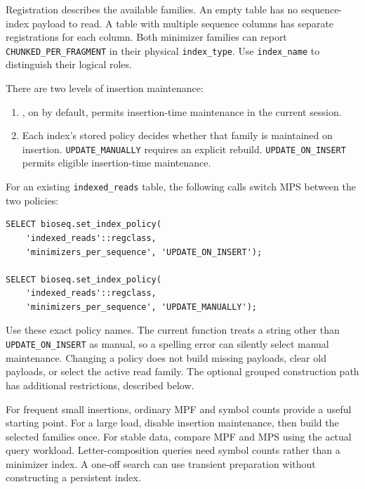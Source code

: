 Registration describes the available families. An empty table has no
sequence-index payload to read. A table with multiple sequence columns
has separate registrations for each column. Both minimizer families can
report \texttt{CHUNKED\_PER\_FRAGMENT} in their physical
\texttt{index\_type}. Use \texttt{index\_name} to distinguish their
logical roles.

There are two levels of insertion maintenance:
\begin{enumerate}
  \item {}, on by default,
    permits insertion-time maintenance in the current session.
  \item Each index's stored policy decides whether that family is
    maintained on insertion. \texttt{UPDATE\_MANUALLY} requires an
    explicit rebuild. \texttt{UPDATE\_ON\_INSERT} permits eligible
    insertion-time maintenance.
\end{enumerate}

For an existing \texttt{indexed\_reads} table, the following calls switch
MPS between the two policies:

\par\noindent\begin{minipage}{\linewidth}
\begin{lstlisting}[style=bioseq-appendix-sql,
  caption={Change one index family's policy for every sequence column.}]
SELECT bioseq.set_index_policy(
    'indexed_reads'::regclass,
    'minimizers_per_sequence', 'UPDATE_ON_INSERT');

SELECT bioseq.set_index_policy(
    'indexed_reads'::regclass,
    'minimizers_per_sequence', 'UPDATE_MANUALLY');
\end{lstlisting}
\end{minipage}

Use these exact policy names. The current function treats a string other
than \texttt{UPDATE\_ON\_INSERT} as manual, so a spelling error can
silently select manual maintenance. Changing a policy does not build
missing payloads, clear old payloads, or select the active read family.
The optional grouped construction path has additional restrictions,
described below.

For frequent small insertions, ordinary MPF and symbol counts provide a
useful starting point. For a large load, disable insertion maintenance,
then build the selected families once. For stable data, compare MPF and
MPS using the actual query workload. Letter-composition queries need
symbol counts rather than a minimizer index. A one-off search can use
transient preparation without constructing a persistent index.

